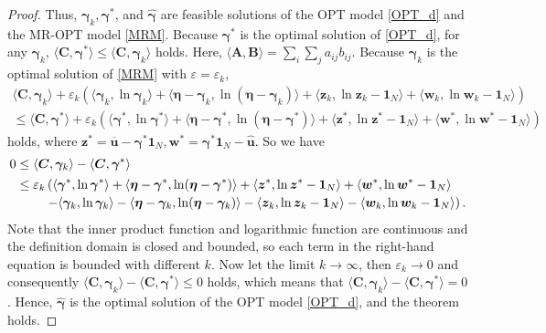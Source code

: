 \documentclass[review,hidelinks,onefignum,onetabnum]{siamart220329}
\begin{document}
\begin{proof}
 Thus, $\bm{\gamma}_{k}, \bm{\gamma}^*$, and $\hat{\bm{\gamma}}$ are feasible solutions of the OPT model \cref{OPT_d} and the MR-OPT model \cref{MRM}. Because $\bm{\gamma}^*$ is the optimal solution of  \cref{OPT_d}, for any $\bm{\gamma}_k$, $\langle \bm{C}, \bm{\gamma}^*\rangle \leq \langle \bm{C}, \bm{\gamma}_k \rangle$ holds. Here, $\langle \bm{A}, \bm{B} \rangle = \sum_i \sum_j a_{ij} b_{ij}$. 
 Because $\bm{\gamma}_k$ is the optimal solution of  \cref{MRM} with $\varepsilon=\varepsilon_k$, 
 \begin{multline*}
     \langle \bm{C}, \bm{\gamma}_k\rangle \! +\! \varepsilon_k(\langle \bm{\gamma}_k, \ln \bm{\gamma}_k \rangle\! +\!  \langle \bm{\eta}-\bm{\gamma}_k, \ln (\bm{\eta}-\bm{\gamma}_k) \rangle  
    \! +\! \langle \bm{z}_k, \ln \bm{z}_k -\bm{1}_N \rangle\! +\!  \langle \bm{w}_k, \ln \bm{w}_k -\bm{1}_N \rangle) \\
     \leq \langle \bm{C}, \bm{\gamma}^* \rangle\!  +\! \varepsilon_k(\langle \bm{\gamma}^*, \ln \bm{\gamma}^* \rangle\! +\! \langle \bm{\eta}-\bm{\gamma}^*, \ln (\bm{\eta}-\bm{\gamma}^*) \rangle  
     \! +\! \langle \bm{z}^*, \ln \bm{z}^* -\bm{1}_N \rangle\! +\! \langle \bm{w}^*, \ln \bm{w}^* -\bm{1}_N \rangle)
 \end{multline*}
 holds, where $\bm{z}^*=\bm{\overline{u}}-\bm{\gamma}^*\bm{1}_N, \bm{w}^*=\bm{\gamma}^* \bm{1}_N-\bm{\hat{u}}$.
 So we have
 \begin{equation*}
     \begin{aligned}
      0 & \leq \langle \bm{C}, \bm{\gamma}_k\rangle - \langle \bm{C}, \bm{\gamma}^* \rangle\\
     &
     \mathtoolsset{multlined-width=0.95\displaywidth}
     \begin{multlined}
         \leq \varepsilon_k \left(\langle \bm{\gamma}^*, \ln \bm{\gamma}^* \rangle+ \langle \bm{\eta}-\bm{\gamma}^*, \ln (\bm{\eta}-\bm{\gamma}^*) \rangle  + \langle \bm{z}^*, \ln \bm{z}^* -\bm{1}_N \rangle+ \langle \bm{w}^*, \ln \bm{w}^* -\bm{1}_N\rangle \right. \\
     \left. - \langle \bm{\gamma}_k, \ln \bm{\gamma}_k \rangle- \langle \bm{\eta}-\bm{\gamma}_k, \ln (\bm{\eta}-\bm{\gamma}_k) \rangle  -\langle \bm{z}_k, \ln \bm{z}_k -\bm{1}_N \rangle- \langle \bm{w}_k, \ln \bm{w}_k -\bm{1}_N \rangle  \right).
     \end{multlined}
     \end{aligned}
 \end{equation*}
 Note that the inner product function and logarithmic function are continuous and the definition domain is closed and bounded, so each term in the right-hand equation is bounded with different $k$. 
 Now let the limit $k\rightarrow \infty$, then $\varepsilon_k\rightarrow 0$ and consequently $\langle \bm{C}, \bm{\gamma}_k\rangle - \langle \bm{C}, \bm{\gamma}^* \rangle \leq 0$ holds, which means that $\langle \bm{C}, \bm{\gamma}_k\rangle - \langle \bm{C}, \bm{\gamma}^* \rangle = 0$. Hence, $\hat{\bm{\gamma}}$ is the optimal solution of the OPT model \cref{OPT_d}, and the theorem holds. 
\end{proof}
\end{document}
